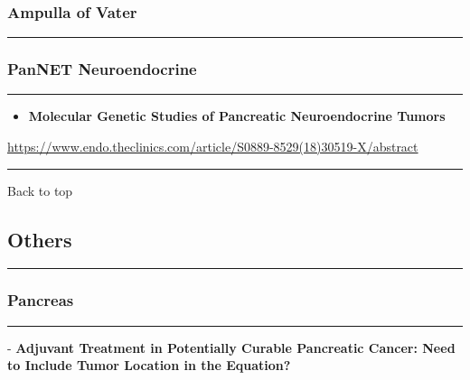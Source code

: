 \documentclass[]{article}
\providecommand{\tightlist}{%
  \setlength{\itemsep}{0pt}\setlength{\parskip}{0pt}}
\begin{document}
\hypertarget{ampulla-of-vater-2}{%
\subsubsection{Ampulla of Vater}\label{ampulla-of-vater-2}}

\begin{center}\rule{0.5\linewidth}{\linethickness}\end{center}

\hypertarget{pannet-neuroendocrine-2}{%
\subsubsection{PanNET Neuroendocrine}\label{pannet-neuroendocrine-2}}

\begin{center}\rule{0.5\linewidth}{\linethickness}\end{center}

\begin{itemize}
\tightlist
\item
  \textbf{Molecular Genetic Studies of Pancreatic Neuroendocrine Tumors}
\end{itemize}

\url{https://www.endo.theclinics.com/article/S0889-8529(18)30519-X/abstract}

\begin{center}\rule{0.5\linewidth}{\linethickness}\end{center}

Back to top

\pagebreak

\hypertarget{others}{%
\subsection{Others}\label{others}}

\begin{center}\rule{0.5\linewidth}{\linethickness}\end{center}

\hypertarget{pancreas-3}{%
\subsubsection{Pancreas}\label{pancreas-3}}

\begin{center}\rule{0.5\linewidth}{\linethickness}\end{center}

 - \textbf{Adjuvant Treatment in Potentially Curable Pancreatic Cancer:
Need to Include Tumor Location in the Equation?}
\end{document}
